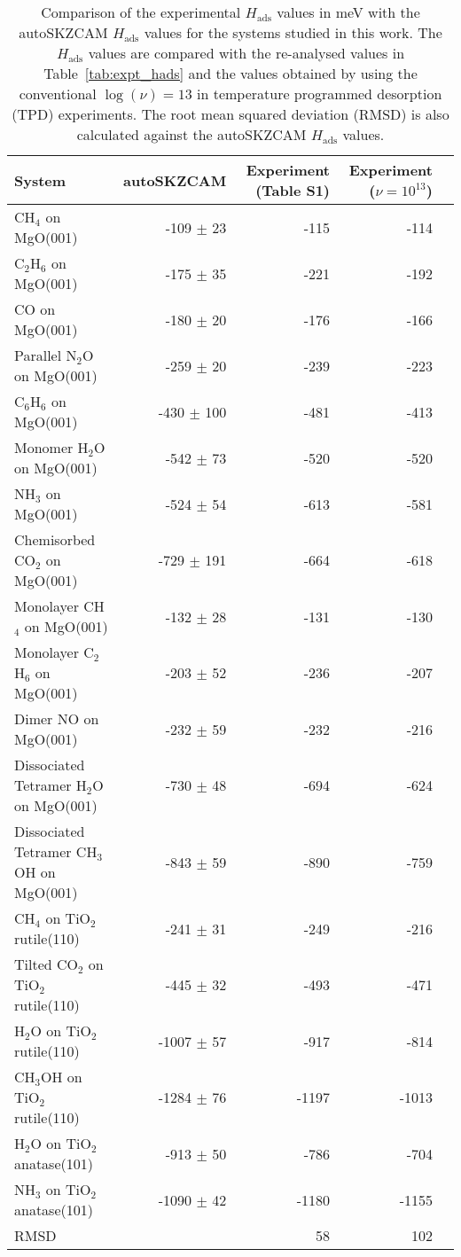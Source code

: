 \begin{table}
\caption{\label{tab:hads_nu13_comparison}Comparison of the experimental $H_\textrm{ads}$ values in meV with the autoSKZCAM $H_\textrm{ads}$ values for the systems studied in this work. The $H_\textrm{ads}$ values are compared with the re-analysed values in Table~\ref{tab:expt_hads} and the values obtained by using the conventional $\log(\nu)=13$ in temperature programmed desorption (TPD) experiments. The root mean squared deviation (RMSD) is also calculated against the autoSKZCAM $H_\textrm{ads}$ values.}
\begin{adjustbox}{center,max width=1\textwidth}
\begin{tabular}{lrrrr}
\toprule
System & autoSKZCAM & Experiment (Table S1) & Experiment ($\nu{=}10^{13}$) \\ 
\midrule
CH$_4$ on MgO(001) & -109 $\pm$ 23 & -115 & -114 \\
C$_2$H$_6$ on MgO(001) & -175 $\pm$ 35 & -221 & -192 \\
CO on MgO(001) & -180 $\pm$ 20 & -176 & -166 \\
Parallel N$_2$O on MgO(001) & -259 $\pm$ 20 & -239 & -223 \\
C$_6$H$_6$ on MgO(001) & -430 $\pm$ 100 & -481 & -413 \\
Monomer H$_2$O on MgO(001) & -542 $\pm$ 73 & -520 & -520 \\
NH$_3$ on MgO(001) & -524 $\pm$ 54 & -613 & -581 \\
Chemisorbed CO$_2$ on MgO(001) & -729 $\pm$ 191 & -664 & -618 \\
Monolayer CH$_4$ on MgO(001) & -132 $\pm$ 28 & -131 & -130 \\
Monolayer C$_2$H$_6$ on MgO(001) & -203 $\pm$ 52 & -236 & -207 \\
Dimer NO on MgO(001) & -232 $\pm$ 59 & -232 & -216 \\
Dissociated Tetramer H$_2$O on MgO(001) & -730 $\pm$ 48 & -694 & -624 \\
Dissociated Tetramer CH$_3$OH on MgO(001) & -843 $\pm$ 59 & -890 & -759 \\
CH$_4$ on TiO$_2$ rutile(110) & -241 $\pm$ 31 & -249 & -216 \\
Tilted CO$_2$ on TiO$_2$ rutile(110) & -445 $\pm$ 32 & -493 & -471 \\
H$_2$O on TiO$_2$ rutile(110) & -1007 $\pm$ 57 & -917 & -814 \\
CH$_3$OH on TiO$_2$ rutile(110) & -1284 $\pm$ 76 & -1197 & -1013 \\
H$_2$O on TiO$_2$ anatase(101) & -913 $\pm$ 50 & -786 & -704 \\
NH$_3$ on TiO$_2$ anatase(101) & -1090 $\pm$ 42 & -1180 & -1155 \\
RMSD &  & 58 & 102 \\
\bottomrule
\end{tabular}
\end{adjustbox}
\end{table}